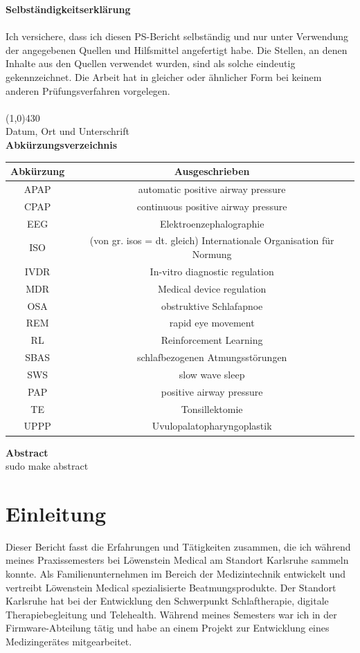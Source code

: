 \documentclass[a4paper, 12pt]{article}
\begin{document}
\newpage
{\bfseries \large Selbständigkeitserklärung}\\ \\
Ich versichere, dass ich diesen PS-Bericht selbständig und nur unter Verwendung der angegebenen
Quellen und Hilfsmittel angefertigt habe. Die Stellen, an denen Inhalte aus den Quellen verwendet
wurden, sind als solche eindeutig gekennzeichnet. Die Arbeit hat in gleicher oder ähnlicher Form bei
keinem anderen Prüfungsverfahren vorgelegen. \\
\vspace{1.0cm} \\
\line(1,0){430} \\
Datum, Ort und Unterschrift\\

\newpage
{\bfseries \large Abkürzungsverzeichnis}\\
\begin{table}[h!]
\centering
\begin{tabular}{c | c}
\hline
\textbf{Abkürzung} & \textbf{Ausgeschrieben} \\ 
\hline 
APAP & automatic positive airway pressure \\
CPAP & continuous positive airway pressure \\
EEG & Elektroenzephalographie \\
ISO & (von gr. isos = dt. gleich) Internationale Organisation für Normung \\
IVDR & In-vitro diagnostic regulation \\
MDR & Medical device regulation \\
OSA & obstruktive Schlafapnoe \\ 
REM & rapid eye movement \\
RL & Reinforcement Learning \\
SBAS & schlafbezogenen Atmungsstörungen \\ 
SWS & slow wave sleep \\
PAP & positive airway pressure \\
TE & Tonsillektomie \\
UPPP & Uvulopalatopharyngoplastik \\
\end{tabular} 
\end{table}

\newpage
{\bfseries \large Abstract}\\
sudo make abstract 

\newpage
\tableofcontents 

\newpage
\section{Einleitung}\label{Einleitung} 
Dieser Bericht fasst die Erfahrungen und Tätigkeiten zusammen, die ich während meines Praxissemesters bei Löwenstein Medical am Standort Karlsruhe sammeln konnte. Als Familienunternehmen im Bereich der Medizintechnik entwickelt und vertreibt Löwenstein Medical spezialisierte Beatmungsprodukte. Der Standort Karlsruhe hat bei der Entwicklung den Schwerpunkt Schlaftherapie, digitale Therapiebegleitung und Telehealth. Während meines Semesters war ich in der Firmware-Abteilung tätig und habe an einem Projekt zur Entwicklung eines Medizingerätes mitgearbeitet. 
\end{document}
